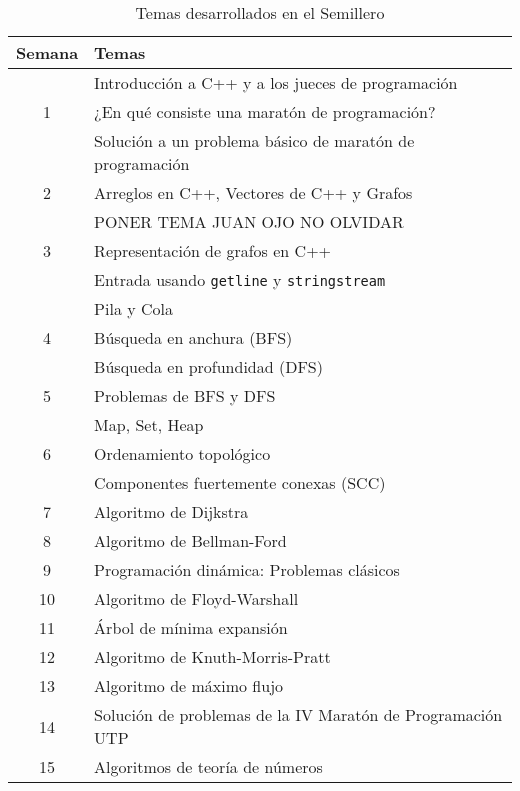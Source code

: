 \documentclass[conference]{IEEEtran}
\begin{document}
\begin{table}
	\centering
	\begin{tabular}{|c|l|}
		\hline
		\textbf{Semana} & \textbf{Temas}\\
		\hline
		  & Introducción a C++ y a los jueces de programación \\
		1 & ¿En qué consiste una maratón de programación?\\
		  & Solución a un problema básico de maratón de programación\\
		\hline
		2 & Arreglos en C++, Vectores de C++ y Grafos\\
		\hline
		  & {\color{red}PONER TEMA JUAN OJO NO OLVIDAR} \\
		3 & Representación de grafos en C++\\
		  & Entrada usando \verb|getline| y \verb|stringstream|\\
		\hline
		  & Pila y Cola\\
		4 & Búsqueda en anchura (BFS)\\
		  & Búsqueda en profundidad (DFS)\\
		\hline
		5 & Problemas de BFS y DFS\\
		\hline
		  & Map, Set, Heap\\
		6 & Ordenamiento topológico\\
		  & Componentes fuertemente conexas (SCC)\\
		\hline
		7 & Algoritmo de Dijkstra \\
		\hline 
		8 & Algoritmo de Bellman-Ford\\
		\hline 
		9 & Programación dinámica: Problemas clásicos\\
		\hline
		10 & Algoritmo de Floyd-Warshall\\
		\hline
		11 & Árbol de mínima expansión\\
		\hline
		12 & Algoritmo de Knuth-Morris-Pratt\\
		\hline
		13 & Algoritmo de máximo flujo\\
		\hline
		14 & Solución de problemas de la IV Maratón de Programación UTP\\
		\hline
		15 & Algoritmos de teoría de números\\
		\hline 
	\end{tabular}
	
	\quad \\
	\caption{Temas desarrollados en el Semillero}
	\label{Tabla:temas}
\end{table}
\end{document}
